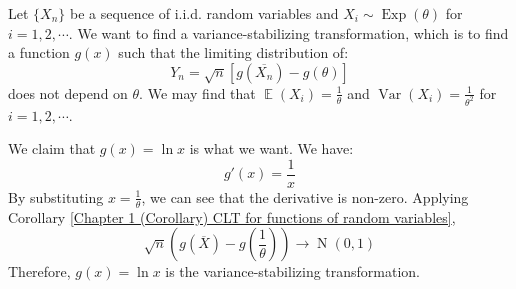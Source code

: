 \documentclass{huhtakm-template-book-v2}
\DeclareMathOperator{\E}{\mathbb{E}}
\DeclareMathOperator{\Var}{Var}
\DeclareMathOperator{\Exp}{Exp}
\DeclareMathOperator{\N}{N}
\begin{document}
\begin{eg}
	Let $\{X_{n}\}$ be a sequence of i.i.d. random variables and $X_{i}\sim\Exp(\theta)$ for $i=1,2,\cdots$. We want to find a variance-stabilizing transformation, which is to find a function $g(x)$ such that the limiting distribution of:
	\begin{equation*}
		Y_{n}=\sqrt{n}[g(\overline{X_{n}})-g(\theta)]
	\end{equation*}
	does not depend on $\theta$. We may find that $\E(X_{i})=\frac{1}{\theta}$ and $\Var(X_{i})=\frac{1}{\theta^{2}}$ for $i=1,2,\cdots$. 
	
	We claim that $g(x)=\ln{x}$ is what we want. We have:
	\begin{equation*}
		g'(x)=\frac{1}{x}
	\end{equation*}
	By substituting $x=\frac{1}{\theta}$, we can see that the derivative is non-zero. Applying Corollary \ref{Chapter 1 (Corollary) CLT for functions of random variables},
	\begin{equation*}
		\sqrt{n}\left(g(\overline{X})-g\left(\frac{1}{\theta}\right)\right)\to\N(0,1)
	\end{equation*}
	Therefore, $g(x)=\ln{x}$ is the variance-stabilizing transformation.
\end{eg}
\end{document}
